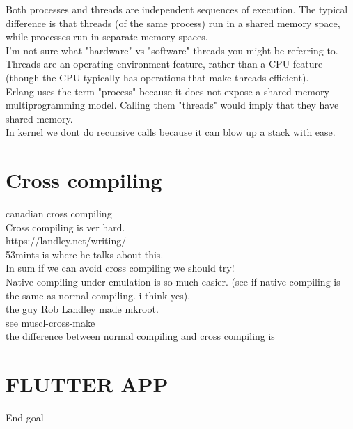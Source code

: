 \documentclass[11pt, a4paper, oneside]{article}
\theoremstyle{definition}
\begin{document}
Both processes and threads are independent sequences of execution. The typical difference is that threads (of the same process) run in a shared memory space, while processes run in separate memory spaces.\\

I'm not sure what "hardware" vs "software" threads you might be referring to. Threads are an operating environment feature, rather than a CPU feature (though the CPU typically has operations that make threads efficient).\\

Erlang uses the term "process" because it does not expose a shared-memory multiprogramming model. Calling them "threads" would imply that they have shared memory.\\


In kernel we dont do recursive calls because it can blow up a stack with ease.\\



\vfill
\pagebreak
\section{Cross compiling}
canadian cross compiling\\
Cross compiling is ver hard. \\
https://landley.net/writing/\\
53mints is where he talks about this.\\

In sum if we can avoid cross compiling we should try!\\

Native compiling under emulation is so much easier. (see if native compiling is the same as normal compiling. i think yes).\\

the guy Rob Landley made mkroot.\\

see muscl-cross-make\\

the difference between normal compiling and cross compiling is 


\vfill
\pagebreak
\section{FLUTTER APP}

End goal\\
\end{document}
